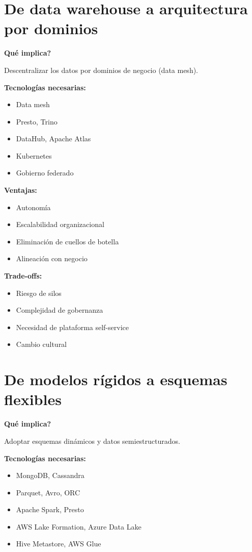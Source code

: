 \documentclass[12pt]{article}
\begin{document}
\section{De data warehouse a arquitectura por dominios}

\textbf{\textquestiondown Qu\'e implica?} \par
Descentralizar los datos por dominios de negocio (data mesh).

\textbf{Tecnolog\'ias necesarias:}
\begin{itemize}
\item Data mesh
\item Presto, Trino
\item DataHub, Apache Atlas
\item Kubernetes
\item Gobierno federado
\end{itemize}

\textbf{Ventajas:}
\begin{itemize}
\item Autonom\'ia
\item Escalabilidad organizacional
\item Eliminaci\'on de cuellos de botella
\item Alineaci\'on con negocio
\end{itemize}

\textbf{Trade-offs:}
\begin{itemize}
\item Riesgo de silos
\item Complejidad de gobernanza
\item Necesidad de plataforma self-service
\item Cambio cultural
\end{itemize}

\section{De modelos r\'igidos a esquemas flexibles}

\textbf{\textquestiondown Qu\'e implica?} \par
Adoptar esquemas din\'amicos y datos semiestructurados.

\textbf{Tecnolog\'ias necesarias:}
\begin{itemize}
\item MongoDB, Cassandra
\item Parquet, Avro, ORC
\item Apache Spark, Presto
\item AWS Lake Formation, Azure Data Lake
\item Hive Metastore, AWS Glue
\end{itemize}
\end{document}
